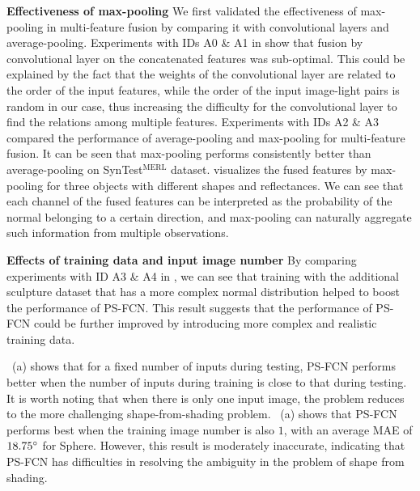 \documentclass[10pt,journal,compsoc]{IEEEtran}
\newcommand{\rev}[1]{#1}
\renewcommand{\paragraph}[1]{\vspace{0.2em}\noindent \textbf{#1 \hspace{0.2em}}}
\begin{document}
\paragraph{Effectiveness of max-pooling} We first validated the effectiveness of max-pooling in multi-feature fusion by comparing it with convolutional layers and average-pooling. 
Experiments with IDs A0 \& A1 in  show that fusion by convolutional layer on the concatenated features was sub-optimal. This could be explained by the fact that the weights of the convolutional layer are related to the order of the input features, while the order of the input image-light pairs is random in our case, thus increasing the difficulty for the convolutional layer to find the relations among multiple features. 
Experiments with IDs A2 \& A3 compared the performance of average-pooling and max-pooling for multi-feature fusion. It can be seen that max-pooling performs consistently better than average-pooling on SynTest$^\text{MERL}$ dataset.
 visualizes the fused features by max-pooling for three objects with different shapes and reflectances. We can see that each channel of the fused features can be interpreted as the probability of the normal belonging to a certain direction, and max-pooling can naturally aggregate such information from multiple observations.

\paragraph{Effects of training data and input image number} 
By comparing experiments with ID A3 \& A4 in , we can see that training with the additional sculpture dataset that has a more complex normal distribution helped to boost the performance of PS-FCN. This result suggests that the performance of PS-FCN could be further improved by introducing more complex and realistic training data. 

~(a) shows that for a fixed number of inputs during testing, PS-FCN performs better when the number of inputs during training is close to that during testing. 
\rev{It is worth noting that when there is only one input image, the problem reduces to the more challenging shape-from-shading problem. \Fref{fig:calib_img_num_syn}~(a) shows that PS-FCN performs best when the training image number is also $1$, with an average MAE of $18.75\degree$ for {\sc Sphere}. However, this result is moderately inaccurate, indicating that PS-FCN has difficulties in resolving the ambiguity in the problem of shape from shading.}
\end{document}

